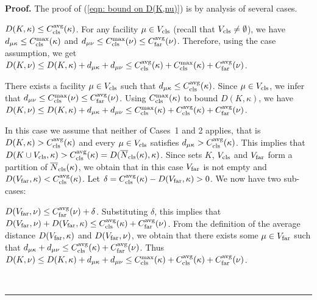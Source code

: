 \documentclass[oneside,final]{ucr}
\newenvironment{proof}[1][Proof]{\textbf{#1.} }{\ \rule{0.5em}{0.5em}}
\begin{document}
\begin{proof}
The proof of (\ref{eqn: bound on D(K,nu)}) is by analysis of several cases.
%

\medskip
\noindent
{} $D(K, \kappa) \leq \clsdist(\kappa)$. For any
facility $\mu \in V_{\cls}$ (recall that $V_{\cls}\neq\emptyset$), 
we have $d_{\mu\kappa} \leq \clsmax(\kappa)$ 
and $d_{\mu\nu} \leq \clsmax(\nu) \leq \fardist(\nu)$. Therefore, using the
case assumption, we get
	$D(K,\nu) \leq D(K,\kappa) + d_{\mu\kappa} + d_{\mu\nu} 
				\leq \clsdist(\kappa) + \clsmax(\kappa) + \fardist(\nu)$.

\medskip
\noindent
{} There exists a facility $\mu\in V_{\cls}$ such that
  $d_{\mu\kappa} \leq \clsdist(\kappa)$. Since $\mu\in V_{\cls}$, we infer
  that $d_{\mu\nu} \leq \clsmax(\nu) \leq \fardist(\nu)$.  Using
  $\clsmax(\kappa)$ to bound $D(K, \kappa)$, we have $D(K, \nu)
  \leq D(K, \kappa) + d_{\mu\kappa} + d_{\mu\nu} \leq
  \clsmax(\kappa) + \clsdist(\kappa) + \fardist(\nu)$.

\medskip
\noindent
{} In this case we assume that neither of Cases~1 and 2 applies, that is
 $D(K, \kappa) > \clsdist(\kappa)$ and every $\mu \in V_{\cls}$ satisfies
 $d_{\mu\kappa} >  \clsdist(\kappa)$. This implies that
$D(K\cup V_{\cls}, \kappa) > \clsdist(\kappa) = D(\wbarclsnb(\kappa), \kappa)$.
Since sets $K$, $V_{\cls}$ and $V_{\far}$ form a partition of $\wbarclsnb(\kappa)$,
we obtain that in this case $V_{\far}$ is not
empty and $D(V_{\far}, \kappa) < \clsdist(\kappa)$. 
Let $\delta = \clsdist(\kappa) - D(V_{\far}, \kappa) > 0$. 
We now have two sub-cases:
%
\begin{description}
	
\item{} {$D(V_{\far}, \nu) \leq \fardist(\nu) + \delta$}.
  Substituting $\delta$, this implies that $D(V_{\far}, \nu) +
  D(V_{\far},\kappa) \le \clsdist(\kappa) + \fardist(\nu)$.  From the
  definition of the average distance $D(V_{\far},\kappa)$ and
  $D(V_{\far}, \nu)$, we obtain that there exists some $\mu \in
  V_{\far}$ such that $d_{\mu\kappa} + d_{\mu\nu} \leq
  \clsdist(\kappa) + \fardist(\nu)$.  Thus $D(K, \nu) \leq D(K,
  \kappa) + d_{\mu\kappa} + d_{\mu\nu} \leq \clsmax(\kappa) +
  \clsdist(\kappa) + \fardist(\nu)$.


\end{description}
\end{proof}
\end{document}
